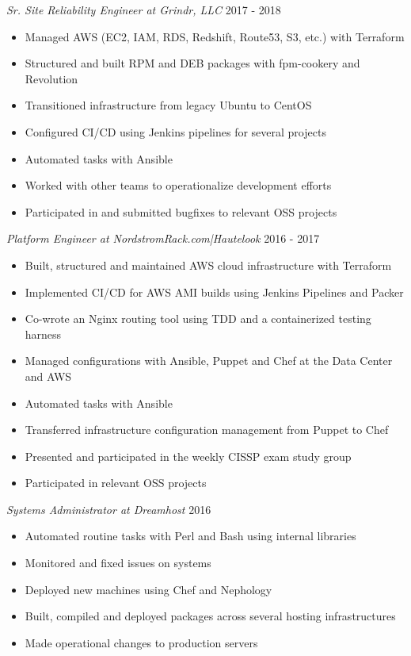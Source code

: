 \documentclass[line]{docs/resume/res}
\begin{document}
\begin{resume}
  {\sl Sr. Site Reliability Engineer at Grindr, LLC} \hfill 2017 - 2018
  \begin{itemize} \itemsep -2pt %
    \item Managed AWS (EC2, IAM, RDS, Redshift, Route53, S3, etc.) with Terraform
    \item Structured and built RPM and DEB packages with fpm-cookery and Revolution
    \item Transitioned infrastructure from legacy Ubuntu to CentOS
    \item Configured CI/CD using Jenkins pipelines for several projects
    \item Automated tasks with Ansible
    \item Worked with other teams to operationalize development efforts
    \item Participated in and submitted bugfixes to relevant OSS projects
  \end{itemize}

  {\sl Platform Engineer at NordstromRack.com|Hautelook} \hfill 2016 - 2017
  \begin{itemize} \itemsep -2pt %
    \item Built, structured and maintained AWS cloud infrastructure with Terraform
    \item Implemented CI/CD for AWS AMI builds using Jenkins Pipelines and Packer
    \item Co-wrote an Nginx routing tool using TDD and a containerized testing harness
    \item Managed configurations with Ansible, Puppet and Chef at the Data Center and AWS
    \item Automated tasks with Ansible
    \item Transferred infrastructure configuration management from Puppet to Chef
    \item Presented and participated in the weekly CISSP exam study group
    \item Participated in relevant OSS projects
  \end{itemize}

  \vspace{0.1in} %

  {\sl Systems Administrator at Dreamhost} \hfill 2016
  \begin{itemize} \itemsep -2pt
    \item Automated routine tasks with Perl and Bash using internal libraries
    \item Monitored and fixed issues on systems
    \item Deployed new machines using Chef and Nephology
    \item Built, compiled and deployed packages across several hosting infrastructures
    \item Made operational changes to production servers
  \end{itemize}


\end{resume}
\end{document}
